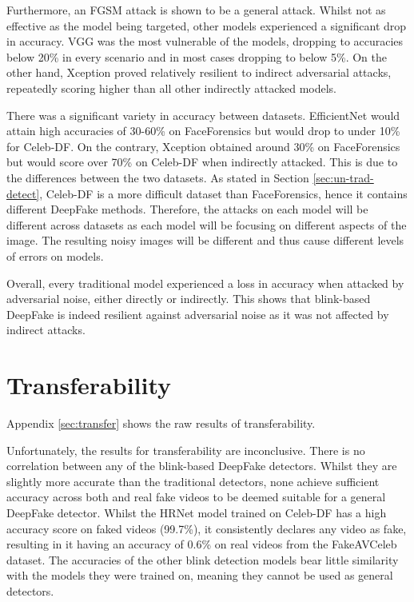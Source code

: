 Furthermore, an FGSM attack is shown to be a general attack. Whilst not as effective as the model being targeted, other models experienced a significant drop in accuracy. VGG was the most vulnerable of the models, dropping to accuracies below 20\% in every scenario and in most cases dropping to below 5\%. On the other hand, Xception proved relatively resilient to indirect adversarial attacks, repeatedly scoring higher than all other indirectly attacked models.

There was a significant variety in accuracy between datasets. EfficientNet would attain high accuracies of 30-60\% on FaceForensics but would drop to under 10\% for Celeb-DF. On the contrary, Xception obtained around 30\% on FaceForensics but would score over 70\% on Celeb-DF when indirectly attacked. This is due to the differences between the two datasets. As stated in Section \ref{sec:un-trad-detect}, Celeb-DF is a more difficult dataset than FaceForensics, hence it contains different DeepFake methods. Therefore, the attacks on each model will be different across datasets as each model will be focusing on different aspects of the image. The resulting noisy images will be different and thus cause different levels of errors on models.

Overall, every traditional model experienced a loss in accuracy when attacked by adversarial noise, either directly or indirectly. This shows that blink-based DeepFake is indeed resilient against adversarial noise as it was not affected by indirect attacks. 

\section{Transferability}

Appendix \ref{sec:transfer} shows the raw results of transferability.

Unfortunately, the results for transferability are inconclusive. There is no correlation between any of the blink-based DeepFake detectors. Whilst they are slightly more accurate than the traditional detectors, none achieve sufficient accuracy across both and real fake videos to be deemed suitable for a general DeepFake detector. Whilst the HRNet model trained on Celeb-DF has a high accuracy score on faked videos (99.7\%), it consistently declares any video as fake, resulting in it having an accuracy of 0.6\% on real videos from the FakeAVCeleb dataset. The accuracies of the other blink detection models bear little similarity with the models they were trained on, meaning they cannot be used as general detectors.

